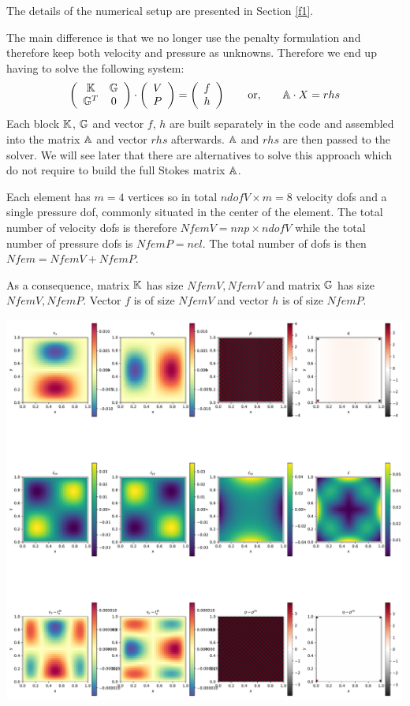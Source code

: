 

The details of the numerical setup are presented in Section \ref{f1}.

The main difference is that we no longer use the penalty formulation and therefore 
keep both velocity and pressure as unknowns. Therefore we end up having to solve 
the following system:
\[
\left(
\begin{array}{cc}
{\mathbb{K}} & {\mathbb{G}} \\ {\mathbb{G}}^T & 0 
\end{array}
\right)
\cdot
\left(
\begin{array}{c}
V \\ P
\end{array}
\right)
=
\left(
\begin{array}{c}
 f \\ h
\end{array}
\right)
\quad\quad
{\rm or,}
\quad\quad
{\mathbb{A}} \cdot X = rhs
\]
Each block ${\mathbb{K}}$, ${\mathbb{G}}$ and vector $f$, $h$ are built separately in the code and assembled into 
the matrix ${\mathbb{A}}$ and vector $rhs$ afterwards. ${\mathbb{A}}$ and $rhs$ are then passed to the solver. 
We will see later that there are alternatives to solve this approach which do not require to 
build the full Stokes matrix ${\mathbb{A}}$. 

Each element has $m=4$ vertices so in total $ndofV\times m=8$ velocity dofs and a single 
pressure dof, commonly situated in the center of the element. The total number of 
velocity dofs is therefore $NfemV=nnp \times ndofV$ while the total number of
pressure dofs is $NfemP=nel$. The total number of dofs is then $Nfem=NfemV+NfemP$.

As a consequence, matrix ${\mathbb{K}}$ has size $NfemV,NfemV$ and matrix ${\mathbb{G}}$ has size $NfemV,NfemP$.
Vector $f$ is of size $NfemV$ and vector $h$ is of size $NfemP$.  



\includegraphics[width=16cm]{python_codes/fieldstone_14/solution.pdf}


